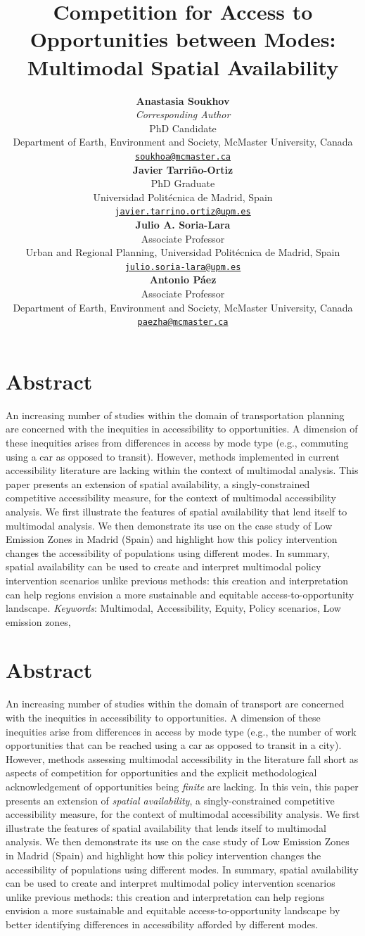\documentclass[]{trbunofficial}
\title{Competition for Access to Opportunities between Modes: Multimodal
Spatial Availability}
\author{%
    \textbf{Anastasia Soukhov}\\\textit{Corresponding Author}\\
  PhD Candidate\\
  Department of Earth, Environment and Society, McMaster University,
Canada\\
  \href{mailto:soukhoa@mcmaster.ca}{\nolinkurl{soukhoa@mcmaster.ca}}\\
  \hfill\break
    \textbf{Javier Tarriño-Ortiz}\\
  PhD Graduate\\
  Universidad Politécnica de Madrid, Spain\\
  \href{mailto:javier.tarrino.ortiz@upm.es}{\nolinkurl{javier.tarrino.ortiz@upm.es}}\\
  \hfill\break
    \textbf{Julio A. Soria-Lara}\\
  Associate Professor\\
  Urban and Regional Planning, Universidad Politécnica de Madrid,
Spain\\
  \href{mailto:julio.soria-lara@upm.es}{\nolinkurl{julio.soria-lara@upm.es}}\\
  \hfill\break
    \textbf{Antonio Páez}\\
  Associate Professor\\
  Department of Earth, Environment and Society, McMaster University,
Canada\\
  \href{mailto:paezha@mcmaster.ca}{\nolinkurl{paezha@mcmaster.ca}}\\
  \hfill\break
  }
\begin{document}
\maketitle


\section{Abstract}
An increasing number of studies within the domain of transportation
planning are concerned with the inequities in accessibility to
opportunities. A dimension of these inequities arises from differences
in access by mode type (e.g., commuting using a car as opposed to
transit). However, methods implemented in current accessibility
literature are lacking within the context of multimodal analysis. This
paper presents an extension of spatial availability, a
singly-constrained competitive accessibility measure, for the context of
multimodal accessibility analysis. We first illustrate the features of
spatial availability that lend itself to multimodal analysis. We then
demonstrate its use on the case study of Low Emission Zones in Madrid
(Spain) and highlight how this policy intervention changes the
accessibility of populations using different modes. In summary, spatial
availability can be used to create and interpret multimodal policy
intervention scenarios unlike previous methods: this creation and
interpretation can help regions envision a more sustainable and
equitable access-to-opportunity landscape.
\hfill\break%
\hfill\break%
\noindent\textit{Keywords}:  Multimodal, Accessibility, Equity, Policy
scenarios, Low emission zones,  
\newpage

\hypertarget{abstract}{%
\section{Abstract}\label{abstract}}

An increasing number of studies within the domain of transport are
concerned with the inequities in accessibility to opportunities. A
dimension of these inequities arise from differences in access by mode
type (e.g., the number of work opportunities that can be reached using a
car as opposed to transit in a city). However, methods assessing
multimodal accessibility in the literature fall short as aspects of
competition for opportunities and the explicit methodological
acknowledgement of opportunities being \emph{finite} are lacking. In
this vein, this paper presents an extension of \emph{spatial
availability}, a singly-constrained competitive accessibility measure,
for the context of multimodal accessibility analysis. We first
illustrate the features of spatial availability that lends itself to
multimodal analysis. We then demonstrate its use on the case study of
Low Emission Zones in Madrid (Spain) and highlight how this policy
intervention changes the accessibility of populations using different
modes. In summary, spatial availability can be used to create and
interpret multimodal policy intervention scenarios unlike previous
methods: this creation and interpretation can help regions envision a
more sustainable and equitable access-to-opportunity landscape by better
identifying differences in accessibility afforded by different modes.
\end{document}
